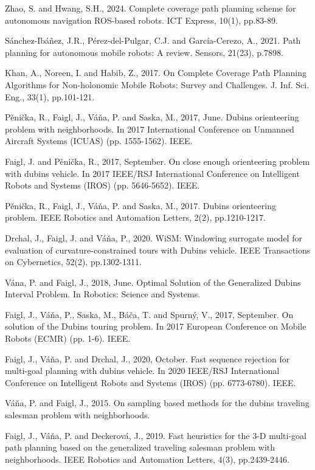 \begin{thebibliography}{9}
\bibitem{}
Zhao, S. and Hwang, S.H., 2024. Complete coverage path planning scheme for autonomous navigation ROS-based robots. ICT Express, 10(1), pp.83-89.

\bibitem{}
Sánchez-Ibáñez, J.R., Pérez-del-Pulgar, C.J. and García-Cerezo, A., 2021. Path planning for autonomous mobile robots: A review. Sensors, 21(23), p.7898.


\bibitem{}
Khan, A., Noreen, I. and Habib, Z., 2017. On Complete Coverage Path Planning Algorithms for Non-holonomic Mobile Robots: Survey and Challenges. J. Inf. Sci. Eng., 33(1), pp.101-121.

Pěnička, R., Faigl, J., Váňa, P. and Saska, M., 2017, June. Dubins orienteering problem with neighborhoods. In 2017 International Conference on Unmanned Aircraft Systems (ICUAS) (pp. 1555-1562). IEEE.

\bibitem
Faigl, J. and Pěnička, R., 2017, September. On close enough orienteering problem with dubins vehicle. In 2017 IEEE/RSJ International Conference on Intelligent Robots and Systems (IROS) (pp. 5646-5652). IEEE.

\bibitem
Pěnička, R., Faigl, J., Váňa, P. and Saska, M., 2017. Dubins orienteering problem. IEEE Robotics and Automation Letters, 2(2), pp.1210-1217.

\bibitem
Drchal, J., Faigl, J. and Váňa, P., 2020. WiSM: Windowing surrogate model for evaluation of curvature-constrained tours with Dubins vehicle. IEEE Transactions on Cybernetics, 52(2), pp.1302-1311.

\bibitem
Vána, P. and Faigl, J., 2018, June. Optimal Solution of the Generalized Dubins Interval Problem. In Robotics: Science and Systems.

\bibitem
Faigl, J., Váňa, P., Saska, M., Báča, T. and Spurný, V., 2017, September. On solution of the Dubins touring problem. In 2017 European Conference on Mobile Robots (ECMR) (pp. 1-6). IEEE.

\bibitem
Faigl, J., Váňa, P. and Drchal, J., 2020, October. Fast sequence rejection for multi-goal planning with dubins vehicle. In 2020 IEEE/RSJ International Conference on Intelligent Robots and Systems (IROS) (pp. 6773-6780). IEEE.

\bibitem
Váňa, P. and Faigl, J., 2015. On sampling based methods for the dubins traveling salesman problem with neighborhoods.



\bibitem
Faigl, J., Váňa, P. and Deckerová, J., 2019. Fast heuristics for the 3-D multi-goal path planning based on the generalized traveling salesman problem with neighborhoods. IEEE Robotics and Automation Letters, 4(3), pp.2439-2446.





\end{thebibliography}
